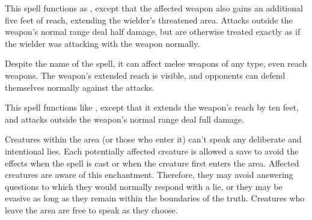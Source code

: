 \spelldur{\durshort}
\begin{spelleffect}
  This spell functions as , except that the affected weapon also gains an additional five feet of reach, extending the wielder's threatened area. Attacks outside the weapon's normal range deal half damage, but are otherwise treated exactly as if the wielder was attacking with the weapon normally.
\end{spelleffect}
\begin{spellnotes}
  Despite the name of the spell, it can affect melee weapons of any type, even reach weapons. The weapon's extended reach is visible, and opponents can defend themselves normally against the attacks.
\end{spellnotes}

\begin{spelleffect}
  This spell functions like , except that it extends the weapon's reach by ten feet, and attacks outside the weapon's normal range deal full damage.
\end{spelleffect}

\spellrng{\rngmed}
\spelldur{\durmed}
\begin{spelleffect}
  Creatures within the area (or those who enter it) can't speak any deliberate and intentional lies. Each potentially affected creature is allowed a save to avoid the effects when the spell is cast or when the creature first enters the area. Affected creatures are aware of this enchantment. Therefore, they may avoid answering questions to which they would normally respond with a lie, or they may be evasive as long as they remain within the boundaries of the truth. Creatures who leave the area are free to speak as they choose.
\end{spelleffect}
